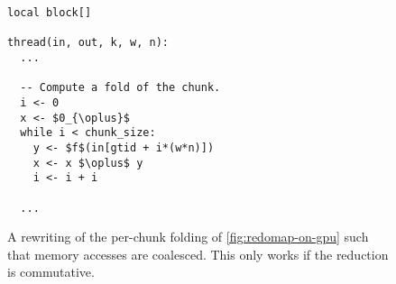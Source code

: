 \begin{figure}
\begin{lstlisting}[language={},mathescape]
local block[]

thread(in, out, k, w, n):
  ...

  -- Compute a fold of the chunk.
  i <- 0
  x <- $0_{\oplus}$
  while i < chunk_size:
    y <- $f$(in[gtid + i*(w*n)])
    x <- x $\oplus$ y
    i <- i + i

  ...
\end{lstlisting}

  \caption{A rewriting of the per-chunk folding of
    \cref{fig:redomap-on-gpu} such that memory accesses are coalesced.
    This only works if the reduction is commutative.}
  \label{fig:redomap-on-gpu-commutative}
\end{figure}


